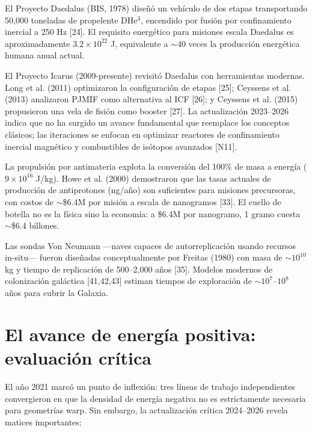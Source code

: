 \documentclass[11pt,a4paper,onecolumn]{article}
\begin{document}
El Proyecto Daedalus (BIS, 1978) diseñó un vehículo de dos etapas transportando 50,000 toneladas de propelente DHe$^3$, encendido por fusión por confinamiento inercial a 250 Hz [24]. El requisito energético para misiones escala Daedalus es aproximadamente $3.2\times10^{22}$ J, equivalente a $\sim$40 veces la producción energética humana anual actual.

El Proyecto Icarus (2009-presente) revisitó Daedalus con herramientas modernas. Long et al. (2011) optimizaron la configuración de etapas [25]; Ceyssens et al. (2013) analizaron PJMIF como alternativa al ICF [26]; y Ceyssens et al. (2015) propusieron una vela de fisión como booster [27]. La actualización 2023--2026 indica que no ha surgido un avance fundamental que reemplace los conceptos clásicos; las iteraciones se enfocan en optimizar reactores de confinamiento inercial magnético y combustibles de isótopos avanzados [N11].

La propulsión por antimateria explota la conversión del 100\% de masa a energía ($9\times10^{16}$ J/kg). Howe et al. (2000) demostraron que las tasas actuales de producción de antiprotones (ng/año) son suficientes para misiones precursoras, con costos de $\sim$\$6.4M por misión a escala de nanogramos [33]. El cuello de botella no es la física sino la economía: a \$6.4M por nanogramo, 1 gramo cuesta $\sim$\$6.4 billones.

Las sondas Von Neumann —naves capaces de autorreplicación usando recursos in-situ— fueron diseñadas conceptualmente por Freitas (1980) con masa de $\sim10^{10}$ kg y tiempo de replicación de 500--2,000 años [35]. Modelos modernos de colonización galáctica [41,42,43] estiman tiempos de exploración de $\sim10^7$--$10^8$ años para cubrir la Galaxia.

\section{El avance de energía positiva: evaluación crítica}

El año 2021 marcó un punto de inflexión: tres líneas de trabajo independientes convergieron en que la densidad de energía negativa no es estrictamente necesaria para geometrías warp. Sin embargo, la actualización crítica 2024--2026 revela matices importantes:
\end{document}
